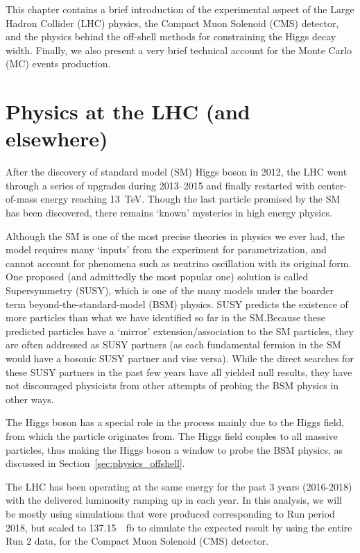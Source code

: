 This chapter contains a brief introduction of the experimental aspect of
the Large Hadron Collider (LHC) physics, the Compact Muon Solenoid (CMS) detector, and the physics behind the off-shell methods
for constraining the Higgs decay width. Finally, we also present a very brief technical account for
the Monte Carlo (MC) events production.

\section{Physics at the LHC (and elsewhere)}
After the discovery of standard model (SM) Higgs boson in 2012, the LHC
went through a series of upgrades during 2013--2015 and finally restarted with center-of-mass energy reaching
\SI{13}{\tera\electronvolt}. Though the last particle promised by the SM has been discovered, there remains
`known' mysteries in high energy physics.

Although the SM is one
of the most precise theories in physics we ever had, the model requires many `inputs' from the experiment
for parametrization, and cannot account for phenomena such as neutrino oscillation with its
original form. One proposed (and admittedly the most popular one) solution is called Supersymmetry (SUSY), which is
one of the many models under the boarder term beyond-the-standard-model (BSM) physics.
SUSY predicts the existence of more particles than what we have identified so far in the SM.\@ Because these
predicted particles have a `mirror' extension/association to the SM particles, they are often addressed as SUSY
partners (as each fundamental fermion in the SM would have a bosonic SUSY partner and vise versa).
While the direct searches for these SUSY partners in the past few years have all yielded null results,
they have not discouraged physicists from other attempts of probing the
BSM physics in other ways.

The Higgs boson has a special role in
the process mainly due to the Higgs field, from which the particle originates from. The Higgs field couples to all 
massive particles, thus making the Higgs boson a window to probe the BSM physics, 
as discussed in Section~\ref{sec:physics_offshell}.

The LHC has been operating at the same energy for the past 3 years (2016-2018) with 
the delivered luminosity ramping up in each year\cite{luminosity}. In this analysis, we will be mostly using
simulations that were produced corresponding to Run period 2018, but scaled to 
\SI{137.15}{\per\femto\barn} to simulate the expected result by using the entire Run 2 data,
for the Compact Muon Solenoid (CMS) detector.


